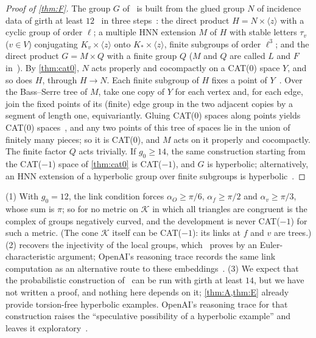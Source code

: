 \documentclass[11pt]{article}
\theoremstyle{definition}
\theoremstyle{plain}
\begin{document}
\begin{proof}[Proof of \cref{thm:F}]
The group $G$ of~\cite[Thm.~1.1]{OAI197b} is built from the glued group $N$ of incidence data of girth at least $12$~\cite[\S\S3--5]{OAI197b} in three steps~\cite[\S\S4.2, 4.5, 4.6]{OAI197b}: the direct product $H=N\times\langle z\rangle$ with a cyclic group of order $\ell$; a multiple HNN extension $M$ of $H$ with stable letters $\tau_v$ ($v\in V$) conjugating $K_v\times\langle z\rangle$ onto $K_*\times\langle z\rangle$, finite subgroups of order $\ell^3$; and the direct product $G=M\times Q$ with a finite group $Q$ ($M$ and $Q$ are called $L$ and $F$ in~\cite{OAI197b}). By \cref{thm:cat0}, $N$ acts properly and cocompactly on a CAT(0) space $Y$, and so does $H$, through $H\to N$. Each finite subgroup of $H$ fixes a point of $Y$~\cite[Cor.~II.2.8]{BridsonHaefliger1999}. Over the Bass--Serre tree of $M$, take one copy of $Y$ for each vertex and, for each edge, join the fixed points of its (finite) edge group in the two adjacent copies by a segment of length one, equivariantly. Gluing CAT(0) spaces along points yields CAT(0) spaces~\cite[II.11.1]{BridsonHaefliger1999}, and any two points of this tree of spaces lie in the union of finitely many pieces; so it is CAT(0), and $M$ acts on it properly and cocompactly. The finite factor $Q$ acts trivially. If $g_0\ge14$, the same construction starting from the CAT($-1$) space of \cref{thm:cat0} is CAT($-1$), and $G$ is hyperbolic; alternatively, an HNN extension of a hyperbolic group over finite subgroups is hyperbolic~\cite{BestvinaFeighn1992}.
\end{proof}

\begin{remark}
(1) With $g_0=12$, the link condition forces $\alpha_O\ge\pi/6$, $\alpha_f\ge\pi/2$ and $\alpha_v\ge\pi/3$, whose sum is $\pi$; so for no metric on $\mathcal K$ in which all triangles are congruent is the complex of groups negatively curved, and the development is never CAT($-1$) for such a metric. (The cone $\mathcal K$ itself can be CAT($-1$): its links at $f$ and $v$ are trees.) (2)  recovers the injectivity of the local groups, which~\cite[Lemma~3.2]{OAI197b} proves by an Euler-characteristic argument; OpenAI's reasoning trace records the same link computation as an alternative route to these embeddings~\cite[\S12]{OAItrace}. (3) We expect that the probabilistic construction of~\cite[\S5]{OAI197b} can be run with girth at least $14$, but we have not written a proof, and nothing here depends on it; \cref{thm:A,thm:E} already provide torsion-free hyperbolic examples. OpenAI's reasoning trace for that construction raises the ``speculative possibility of a hyperbolic example'' and leaves it exploratory~\cite[\S\S17 and~21]{OAItrace}.
\end{remark}
\end{document}
